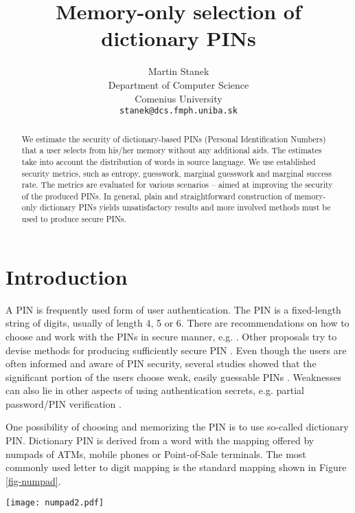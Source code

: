 \documentclass[a4paper, 11pt]{article}
\begin{document}
\title{\textbf{Memory-only selection of dictionary PINs}}
\author{Martin Stanek \\[1ex]
  Department of Computer Science \\ 
  Comenius University \\
  {\small\texttt{stanek@dcs.fmph.uniba.sk}}}
\date{}
\maketitle

\begin{abstract}
We estimate the security of dictionary-based PINs (Personal Identification Numbers) that 
a user selects from his/her memory without any additional aids. The estimates take into 
account the distribution of words in source language. We use established security metrics, 
such as entropy, guesswork, marginal guesswork and marginal success rate. The metrics are 
evaluated for various scenarios -- aimed at improving the security of the produced PINs. 
In general, plain and straightforward construction of memory-only dictionary PINs yields 
unsatisfactory results and more involved methods must be used to produce secure PINs.
\end{abstract}


\section{Introduction}

A PIN is frequently used form of user authentication. The PIN is a fixed-length string of digits, 
usually of length 4, 5 or 6. There are recommendations on how to choose and work with the PINs 
in secure manner, e.g. \cite{PCI,VISA,ISO}. Other proposals try to devise methods for producing
sufficiently secure PIN \cite{JL11,JL13}.
Even though the users are often informed and aware of PIN security, several studies showed that 
the significant portion of the users choose weak, easily guessable PINs \cite{PINstudy,BPA12}.
Weaknesses can also lie in other aspects of using authentication secrets, e.g. partial password/PIN 
verification \cite{AJ13}.

One possibility of choosing and memorizing the PIN is to use so-called dictionary PIN. Dictionary PIN is
derived from a word with the mapping offered by numpads of ATMs, mobile phones or Point-of-Sale terminals.
The most commonly used letter to digit mapping is the standard mapping shown in Figure \ref{fig-numpad}.
\begin{figure*}[h]
\begin{center}\texttt{[image: numpad2.pdf]}\end{center}
\caption{The standard mapping}
\label{fig-numpad}
\end{figure*}
\end{document}
